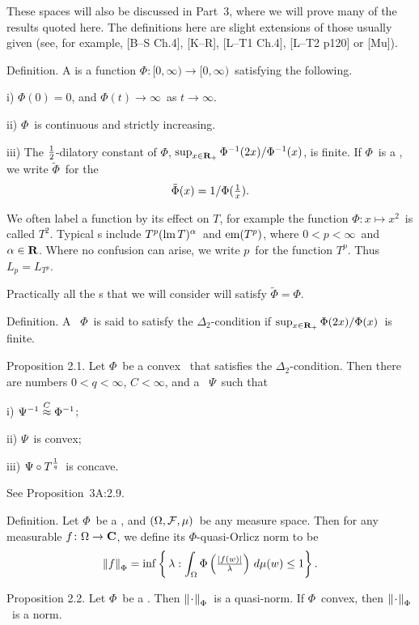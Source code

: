 These spaces will also be discussed in
Part~3, where we will prove many of the
results quoted here. The definitions here are slight extensions of those
usually given (see, for example, [B--S Ch.4], [K--R], [L--T1 Ch.4], [L--T2
p120] or [Mu]).
 
\proclaim Definition. A {\dt \nqOf} is a function
$\Phi\colon[0,\infty)\to[0,\infty)$\ satisfying the following.
\item{i)} $\Phi(0)=0$, and $\Phi(t)\to\infty$\ as $t\to\infty$.
\item{ii)} $\Phi$\ is continuous and strictly increasing.
\item{iii)} The {\dt $\half$-dilatory
constant} of $\Phi$, $\sup_{x\in\R_+}
\Phi^{-1}(2 x)/\Phi^{-1}(x)$, is finite.
\moreproclaim\noindent
If $\Phi$\ is a \nqOf, we write $\tilde\Phi$\ for the
\nqOf
$$\tilde\Phi(x)=1/\Phi(\ts{1\over x}) .$$
 
We often label a function by its effect on $T$, for example the function
$\Phi\colon x\mapsto x^2$\ is called $T^2$.
Typical \nqOf s include $T^p(\lm T)^\alpha$\ and
$\em(T^p)$, where $0<p<\infty$\ and $\alpha\in\R$.
Where no confusion can arise, we write $p$\ for the function $T^p$. Thus
$L_p=L_{T^p}$.
 
Practically all the \nqOf s that we will consider will satisfy
$\tilde\Phi=\Phi$.
 
\proclaim Definition. A \nqOf\ $\Phi$\ is said to satisfy the {\dt
$\Delta_2$-condition} if\/ $\sup_{x\in\R_+} \Phi(2x)/\Phi(x)$\ is finite.
 
\proclaim Proposition 2.1. Let $\Phi$\
be a convex \nqOf\ that satisfies the
$\Delta_2$-condition. Then there are
numbers $0<q<\infty$, $C<\infty$, and a
\nqOf\ $\Psi$\ such that
\item{i)} $\Psi^{-1} \labelledapprox C \Phi^{-1} $;
\item{ii)} $\Psi$\ is convex;
\item{iii)} $\Psi\circ T^{\invq}$\ is concave.
 
\Proof See Proposition~3A:2.9.
\endproof
 
\proclaim Definition. Let $\Phi$\ be a
\nqOf, and $\measspace$\ be any measure
space. Then for any measurable $f\colon\Omega\to\C$, we define its
{\dt $\Phi$-quasi-Orlicz norm} to be
$$ \normf_\Phi = \inf\left\{\,\lambda:\int_\Omega
                 \Phi\left(\ts{\modfo w \over\lambda}\right)
                 \,d\mu(w) \le 1 \right\}.$$
 
\proclaim Proposition 2.2. Let $\Phi$\
be a \nqOf. Then $\normdot_\Phi$\ is a
quasi-norm. If $\Phi$\ convex, then $\normdot_\Phi$\ is a norm.
 

